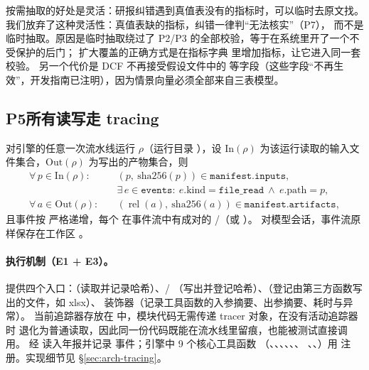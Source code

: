 \begin{tradeoff}
按需抽取的好处是灵活：研报纠错遇到真值表没有的指标时，可以临时去原文找。我们放弃了这种灵活性：真值表缺的指标，纠错一律判“无法核实”（P7），
而不是临时抽取。原因是临时抽取绕过了 P2/P3 的全部校验，等于在系统里开了一个不受保护的后门；
扩大覆盖的正确方式是在指标字典  里增加指标，让它进入同一套校验。
另一个代价是 DCF 不再接受假设文件中的  等字段（这些字段“不再生效”，开发指南已注明），因为情景向量必须全部来自三表模型。
\end{tradeoff}

\subsection{P5\quad 所有读写走 tracing}
\label{sec:pr-p5}

\begin{invariant}[读写留痕]\label{inv:pr-trace}
对引擎的任意一次流水线运行 $\rho$（运行目录 ），设 $\mathrm{In}(\rho)$ 为该运行读取的输入文件集合，$\mathrm{Out}(\rho)$ 为写出的产物集合，则
\begin{align}
  \forall\,p\in\mathrm{In}(\rho):&\quad (p,\ \mathrm{sha256}(p)) \in \texttt{manifest.inputs}, \label{eq:pr-in}\\
  &\quad \exists\,e\in\texttt{events}:\ e.\text{kind}=\texttt{file\_read}\ \wedge\ e.\text{path}=p, \nonumber\\
  \forall\,a\in\mathrm{Out}(\rho):&\quad (\operatorname{rel}(a),\ \mathrm{sha256}(a)) \in \texttt{manifest.artifacts}, \label{eq:pr-out}
\end{align}
且事件按  严格递增，每个  在事件流中有成对的 /（或 ）。
对模型会话，事件流原样保存在工作区 。
\end{invariant}

\paragraph{执行机制（E1 + E3）。} 提供四个入口：（读取并记录哈希）、/
（写出并登记哈希）、（登记由第三方函数写出的文件，如 xlsx）、 装饰器（记录工具函数的入参摘要、出参摘要、耗时与异常）。
当前追踪器存放在  中，模块代码无需传递 tracer 对象，在没有活动追踪器时  退化为普通读取，因此同一份代码既能在流水线里留痕，也能被测试直接调用。
 经  读入年报并记录  事件；引擎中 9 个核心工具函数
（、、、、、、
、、）用  注册。实现细节见 \S\ref{sec:arch-tracing}。

